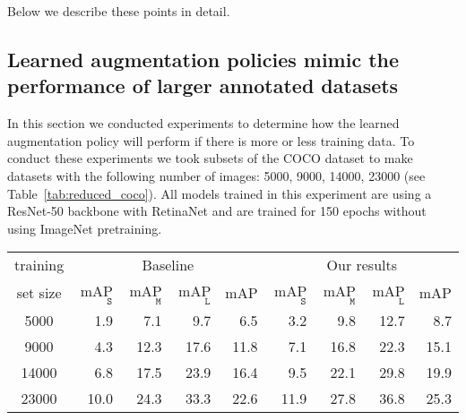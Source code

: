 \documentclass[10pt,twocolumn,letterpaper]{article}
\begin{document}
Below we describe these points in detail.  

\fi

\subsection{Learned augmentation policies mimic the performance of larger annotated datasets}

In this section we conducted experiments to determine how the learned augmentation policy will perform if there is more or less training data. To conduct these experiments we took subsets of the COCO dataset to make datasets with the following number of images: 5000, 9000, 14000, 23000 (see Table~\ref{tab:reduced_coco}). All models trained in this experiment are using a ResNet-50 backbone with RetinaNet and are trained for 150 epochs without using ImageNet pretraining.

\begin{table*}[h!]
\centering
\small
\begin{tabular}{c|rrrr|rrrr}
  \hline
  training & \multicolumn{4}{c|}{Baseline} & \multicolumn{4}{c}{Our results}  \\
   set size & mAP$_{\texttt S}$ &  mAP$_{\texttt M}$ &  mAP$_{\texttt L}$ & mAP & mAP$_{\texttt S}$ &  mAP$_{\texttt M}$ &  mAP$_{\texttt L}$ & mAP \\
  \hline
  5000  &1.9 &7.1& 9.7& 6.5 &3.2 &9.8&12.7& 8.7 \\
  9000 &4.3&12.3& 17.6& 11.8  &7.1 & 16.8&22.3& 15.1 \\
  14000 &6.8&17.5& 23.9& 16.4 &9.5 & 22.1&29.8& 19.9 \\
  23000 &10.0&24.3& 33.3& 22.6 & 11.9&27.8&36.8& 25.3  \\
  \hline
\end{tabular}
\caption{\textbf{Learned augmentation policy is especially beneficial for small datasets and small objects.} Mean average precision (mAP) for RetinaNet model trained on COCO with varying subsets of the original training set. mAP$_{\texttt S}$, mAP$_{\texttt M}$ and mAP$_{\texttt L}$ denote the mean average precision for small, medium and large examples. Note the complete COCO training set consists of 118K examples.The same policy found on the 5000 COCO images was used in all of the experiments. The models in the first row were trained on the same 5000 images that the policies were searched on. }
\label{tab:reduced_coco}  
\end{table*}
\end{document}

